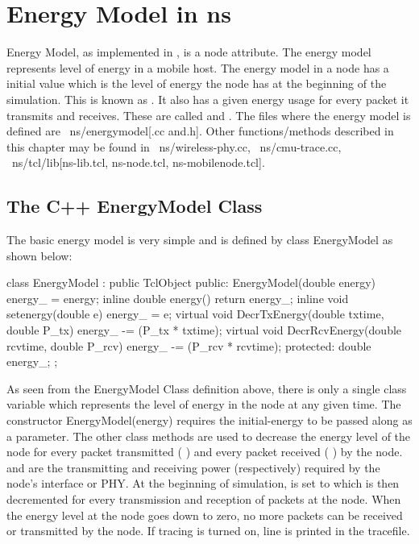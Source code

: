 \chapter{Energy Model in ns}
\label{chap:enerymodel}

Energy Model, as implemented in \ns, is a node attribute. The
energy model represents level of energy in a mobile host. The energy
model in a node has a initial value which is the level of energy the node
has at the beginning of the simulation. This is known as
.
It also has a given energy usage
for every packet it transmits and receives. These are called
 and .
The files where the energy model is defined are ~ns/energymodel[.cc and.h].
Other functions/methods described in this chapter may be found in
~ns/wireless-phy.cc, ~ns/cmu-trace.cc, ~ns/tcl/lib[ns-lib.tcl, 
ns-node.tcl, ns-mobilenode.tcl].


\section{The C++ EnergyModel Class}
\label{sec:c++energymodel}

The basic energy model is very simple and is defined by class EnergyModel
as shown below:

\begin{program}
class EnergyModel : public TclObject {
public:
  EnergyModel(double energy) { energy_ = energy; }
  inline double energy() { return energy_; }
  inline void setenergy(double e) {energy_ = e;}
  virtual void DecrTxEnergy(double txtime, double P_tx) {
    energy_ -= (P_tx * txtime);
  }
  virtual void DecrRcvEnergy(double rcvtime, double P_rcv) {
    energy_ -= (P_rcv * rcvtime);
  }
protected:
  double energy_;
};   
\end{program}

As seen from the EnergyModel Class definition above, there is only a
single class variable  which represents the
level of energy in the node at any given time. The constructor
EnergyModel(energy) requires the initial-energy to be passed along as a 
parameter. The other class methods are
used to decrease the energy level of the node for every packet transmitted
( ) and every packet received (
) by
the node.  and  are the
transmitting and
receiving power (respectively) required by the node's interface or PHY.
At the beginning of simulation,  is set to
 which is then
decremented for every transmission and reception of packets at the node.
When the energy level at the node goes down to zero, no more packets can
be received or transmitted by the node. If tracing is turned on, line
is printed in the tracefile.


